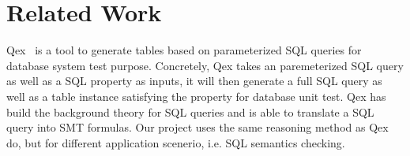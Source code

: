 \documentclass{article}
\begin{document}
\section{Related Work}

Qex~\cite{veanes2010qex,veanes2009symbolic} is a tool to generate tables based on parameterized SQL queries for database system test purpose. Concretely, Qex takes an paremeterized SQL query as well as a SQL property as inputs, it will then generate a full SQL query as well as a table instance satisfying the property for database unit test. Qex has build the background theory for SQL queries and is able to translate a SQL query into SMT formulas. Our project uses the same reasoning method as Qex do, but for different application scenerio, i.e. SQL semantics checking.

{}

\end{document}
